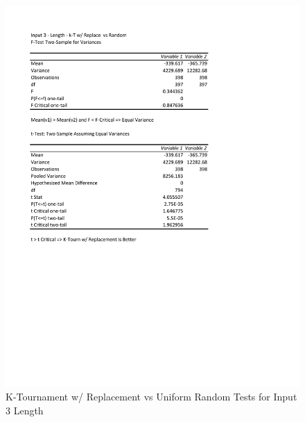 \documentclass[times]{article}
\begin{document}
	\begin{figure}
		\caption{K-Tournament w/ Replacement vs Uniform Random Tests for Input 3 Length}
		\label{fig:3parent2}
		\includegraphics[width=\textwidth]{./t_test/3_parent2.pdf}
	\end{figure}
\end{document}
